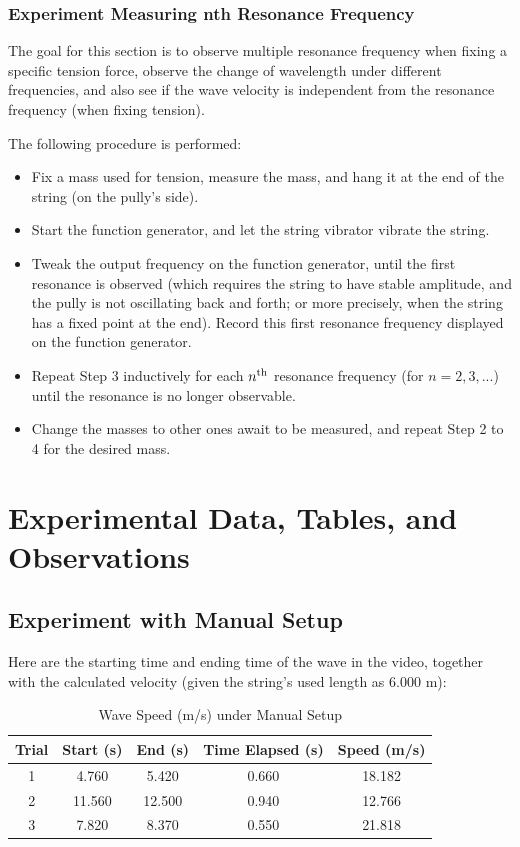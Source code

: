 \documentclass{article}
\begin{document}
\subsubsection{Experiment Measuring nth Resonance Frequency}
The goal for this section is to observe multiple resonance frequency when fixing a specific tension force, observe the change of wavelength under different frequencies, and also see if the wave velocity is independent from the resonance frequency (when fixing tension).

The following procedure is performed:
\begin{itemize}
    \item[1.] Fix a mass used for tension, measure the mass, and hang it at the end of the string (on the pully's side).
    \item[2.] Start the function generator, and let the string vibrator vibrate the string.
    \item[3.] Tweak the output frequency on the function generator, until the first resonance is observed (which requires the string to have stable amplitude, and the pully is not oscillating back and forth; or more precisely, when the string has a fixed point at the end). Record this first resonance frequency displayed on the function generator.
    \item[4.] Repeat Step 3 inductively for each $n^\textmd{th}$ resonance frequency (for $n=2,3,...$) until the resonance is no longer observable.
    \item[5.] Change the masses to other ones await to be measured, and repeat Step 2 to 4 for the desired mass.
\end{itemize}

\newpage

\section{Experimental Data, Tables, and Observations}
\subsection{Experiment with Manual Setup}
Here are the starting time and ending time of the wave in the video, together with the calculated velocity (given the string's used length as $6.000$ m):
\begin{table}[h!]
\centering
\caption{Wave Speed (m/s) under Manual Setup}
\begin{tabular}{c|c|c|c|c}
\toprule
\textbf{Trial} & \textbf{Start (s)} & \textbf{End (s)} & \textbf{Time Elapsed (s)} & \textbf{Speed (m/s)} \\
\midrule
\midrule
1 & 4.760 & 5.420 & 0.660 & 18.182 \\
\hline
2 & 11.560 & 12.500 & 0.940 & 12.766 \\
\hline
3 & 7.820 & 8.370 & 0.550 & 21.818 \\
\bottomrule
\end{tabular}
\label{tab:data_manual}
\end{table}
\end{document}
